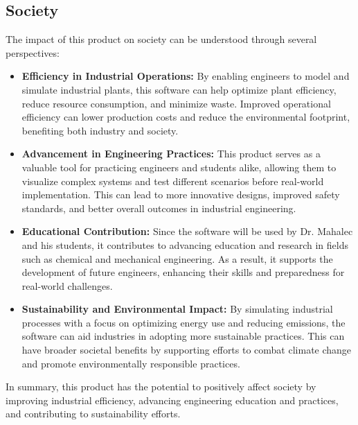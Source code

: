 \documentclass[12pt]{article}
\begin{document}
\subsection{Society}
The impact of this product on society can be understood through several perspectives:

\begin{itemize}
    \item \textbf{Efficiency in Industrial Operations:} By enabling engineers to model and simulate industrial plants, this software can help optimize plant efficiency, reduce resource consumption, and minimize waste. Improved operational efficiency can lower production costs and reduce the environmental footprint, benefiting both industry and society.
    
    \item \textbf{Advancement in Engineering Practices:} This product serves as a valuable tool for practicing engineers and students alike, allowing them to visualize complex systems and test different scenarios before real-world implementation. This can lead to more innovative designs, improved safety standards, and better overall outcomes in industrial engineering.
    
    \item \textbf{Educational Contribution:} Since the software will be used by Dr. Mahalec and his students, it contributes to advancing education and research in fields such as chemical and mechanical engineering. As a result, it supports the development of future engineers, enhancing their skills and preparedness for real-world challenges.
    
    \item \textbf{Sustainability and Environmental Impact:} By simulating industrial processes with a focus on optimizing energy use and reducing emissions, the software can aid industries in adopting more sustainable practices. This can have broader societal benefits by supporting efforts to combat climate change and promote environmentally responsible practices.
\end{itemize}

In summary, this product has the potential to positively affect society by improving industrial efficiency, advancing engineering education and practices, and contributing to sustainability efforts.
\end{document}
